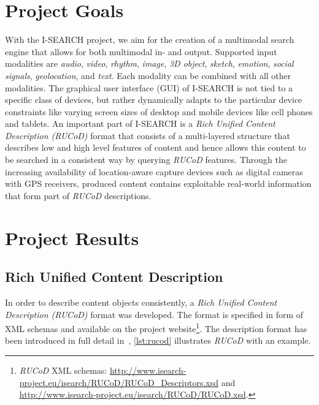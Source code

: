\documentclass{www2012-comp-accepted}
\let\oldemph\emph
\renewcommand{\emph}[1]{\oldemph{\fontsize{9}{9}\selectfont #1}}
\newcommand{\inlinelistingsize}{\fontsize{8pt}{11pt}}
\let\oldurl\url
\renewcommand{\url}[1]{\inlinelistingsize\oldurl{#1}}
\begin{document}
\section{Project Goals} \label{sec:projectgoals}
With the \mbox{I-SEARCH} project, we aim for the creation of a multimodal search engine that allows for both multimodal in- and output.
Supported input modalities are \emph{audio}, \emph{video}, \emph{rhythm}, \emph{image}, \emph{3D object}, \emph{sketch}, \emph{emotion}, \emph{social signals}, \emph{geolocation}, and \emph{text}.
Each modality can be combined with all other modalities.
The graphical user interface (GUI) of \mbox{I-SEARCH} is not tied to a specific class of devices, but rather dynamically adapts to the particular device constraints like varying screen sizes of desktop and mobile devices like cell phones and tablets.
An important part of \mbox{I-SEARCH} is a \emph{Rich Unified Content Description \mbox{(RUCoD)}} format that consists of a multi-layered structure that describes low and high level features of content and hence allows this content to be searched in a consistent way by querying \mbox{\emph{RUCoD}} features.
Through the increasing availability of location-aware capture devices such as digital cameras with GPS receivers, produced content contains exploitable real-world information that form part of \mbox{\emph{RUCoD}} descriptions.

\section{Project Results} \label{sec:projectresults}

\subsection{Rich Unified Content Description}
In order to describe content objects consistently, a \emph{Rich Unified Content Description \mbox{(RUCoD)}} format was developed.
The format is specified in form of XML schemas and available on the project website\footnote{\mbox{\emph{RUCoD}} XML schemas: \url{http://www.isearch-project.eu/isearch/RUCoD/RUCoD_Descriptors.xsd} and \url{http://www.isearch-project.eu/isearch/RUCoD/RUCoD.xsd}.}.
The description format has been introduced in full detail in~\cite{ijmis2010}, \autoref{lst:rucod} illustrates \mbox{\emph{RUCoD}} with an example.
\end{document}
